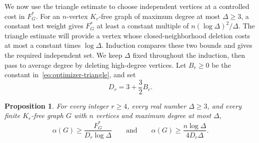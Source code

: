 \documentclass[11pt]{article}
\newtheorem{proposition}[theorem]{Proposition}
\theoremstyle{definition}
\theoremstyle{remark}
\numberwithin{equation}{section}
\begin{document}
We now use the triangle estimate to choose independent vertices at a
controlled cost in $F_G^*$. For an $n$-vertex $K_r$-free graph of maximum
degree at most $\Delta\ge3$,
a constant test weight gives $F_G^*$ at least a constant multiple of
$n(\log\Delta)^2/\Delta$. The triangle estimate will provide a vertex
whose closed-neighborhood deletion costs at most a constant times
$\log\Delta$. Induction compares these two bounds and gives the required
independent set. We keep $\Delta$ fixed throughout the induction, then
pass to average degree by deleting high-degree vertices.
Let $B_r\ge0$ be the constant in~\eqref{eq:optimizer-triangle}, and set
\begin{equation}
 D_r=3+\frac32 B_r.
 \label{eq:independence-constant}
\end{equation}

\begin{proposition}\label{prop:maximum-degree}
For every integer $r\ge4$, every real number $\Delta\ge3$, and every finite $K_r$-free graph $G$
with $n$ vertices and maximum degree at most $\Delta$,
\[
 \alpha(G)\ge \frac{F_G^*}{D_r\log\Delta}
 \qquad\text{and}\qquad
 \alpha(G)\ge \frac{n\log\Delta}{4D_r\Delta}.
\]
\end{proposition}
\end{document}
